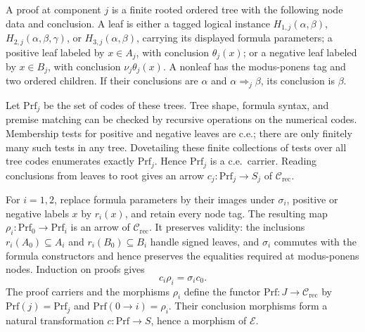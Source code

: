 \documentclass[11pt]{article}
\begin{document}
A proof at component $j$ is a finite rooted ordered tree with
the following node data and conclusion. A leaf is either a
tagged logical instance $H_{1,j}(\alpha,\beta)$,
$H_{2,j}(\alpha,\beta,\gamma)$, or
$H_{3,j}(\alpha,\beta)$, carrying its displayed formula
parameters; a positive leaf labeled by $x\in A_j$, with
conclusion $\theta_j(x)$; or a negative leaf labeled by
$x\in B_j$, with conclusion $\nu_j\theta_j(x)$.
A nonleaf has the modus-ponens tag and two ordered children.
If their conclusions are $\alpha$ and
$\alpha\Rightarrow_j\beta$, its conclusion is $\beta$.

Let $\mathrm{Prf}_j$ be the set of codes of these trees.
Tree shape, formula syntax, and premise matching can be checked
by recursive operations on the numerical codes. Membership tests
for positive and negative leaves are c.e.; there are only finitely
many such tests in any tree. Dovetailing these finite collections
of tests over all tree codes enumerates exactly $\mathrm{Prf}_j$.
Hence $\mathrm{Prf}_j$ is a c.e.\ carrier.
Reading conclusions from leaves to root gives an arrow
$c_j:\mathrm{Prf}_j\to S_j$ of $\mathcal C_{\mathrm{rec}}$.

For $i=1,2$, replace formula parameters by their images under
$\sigma_i$, positive or negative labels $x$ by $r_i(x)$, and
retain every node tag. The resulting map
$\rho_i:\mathrm{Prf}_0\to\mathrm{Prf}_i$ is an arrow of
$\mathcal C_{\mathrm{rec}}$.
It preserves validity: the inclusions $r_i(A_0)\subseteq A_i$
and $r_i(B_0)\subseteq B_i$ handle signed leaves, and
$\sigma_i$ commutes with the formula constructors and hence
preserves the equalities required at modus-ponens nodes.
Induction on proofs gives
\[
 c_i\rho_i=\sigma_i c_0.
\]
The proof carriers and the morphisms $\rho_i$ define the functor
$\mathrm{Prf}:J\to\mathcal C_{\mathrm{rec}}$ by
$\mathrm{Prf}(j)=\mathrm{Prf}_j$ and
$\mathrm{Prf}(0\to i)=\rho_i$. Their conclusion morphisms form a
natural transformation $c:\mathrm{Prf}\to S$, hence a morphism of
$\mathcal E$.
\end{document}
